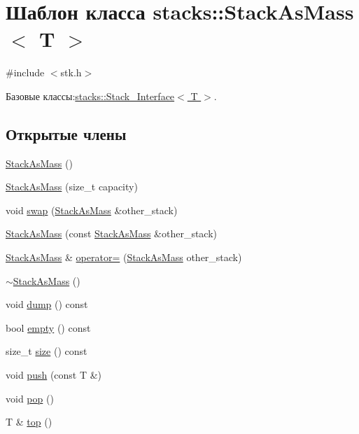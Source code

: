 \hypertarget{classstacks_1_1_stack_as_mass}{}\section{Шаблон класса stacks\+:\+:Stack\+As\+Mass$<$ T $>$}
\label{classstacks_1_1_stack_as_mass}


{\ttfamily \#include $<$stk.\+h$>$}



Базовые классы\+:\hyperlink{classstacks_1_1_stack___interface}{stacks\+::\+Stack\+\_\+\+Interface$<$ T $>$}.

\subsection*{Открытые члены}
\begin{DoxyCompactItemize}
\item 
\hyperlink{classstacks_1_1_stack_as_mass_aa5dca4927f4cf652cacd3741a45eb2ad}{Stack\+As\+Mass} ()
\item 
\hyperlink{classstacks_1_1_stack_as_mass_a2b85fdd4e6f15092e1fa96bf35398985}{Stack\+As\+Mass} (size\+\_\+t capacity)
\item 
void \hyperlink{classstacks_1_1_stack_as_mass_ab347dc6a6b317fb438d865ee854b9293}{swap} (\hyperlink{classstacks_1_1_stack_as_mass}{Stack\+As\+Mass} \&other\+\_\+stack)
\item 
\hyperlink{classstacks_1_1_stack_as_mass_ab5096a618f3822ca8ebc7c60a2218c24}{Stack\+As\+Mass} (const \hyperlink{classstacks_1_1_stack_as_mass}{Stack\+As\+Mass} \&other\+\_\+stack)
\item 
\hyperlink{classstacks_1_1_stack_as_mass}{Stack\+As\+Mass} \& \hyperlink{classstacks_1_1_stack_as_mass_a3f5a454382082b41a6b57c4862491568}{operator=} (\hyperlink{classstacks_1_1_stack_as_mass}{Stack\+As\+Mass} other\+\_\+stack)
\item 
\hyperlink{classstacks_1_1_stack_as_mass_a83bdc71146620e82a676ae572a6756b6}{$\sim$\+Stack\+As\+Mass} ()
\item 
void \hyperlink{classstacks_1_1_stack_as_mass_a4893c23d722d514f79a8e8fd10b9f0eb}{dump} () const 
\item 
bool \hyperlink{classstacks_1_1_stack_as_mass_a0e8e793c3f09ebe95679a4a588f7973d}{empty} () const 
\item 
size\+\_\+t \hyperlink{classstacks_1_1_stack_as_mass_a8859a0ecb70f45282bc9b5c8b9ade0fc}{size} () const 
\item 
void \hyperlink{classstacks_1_1_stack_as_mass_a543d8f8b0b88bf906da28af2a39d61d5}{push} (const T \&)
\item 
void \hyperlink{classstacks_1_1_stack_as_mass_a85fe3d75069a6304ab95e8715c5b3cb6}{pop} ()
\item 
T \& \hyperlink{classstacks_1_1_stack_as_mass_a6b1b18b02db67e82ed6abbcfdc8ede1e}{top} ()
\end{DoxyCompactItemize}
